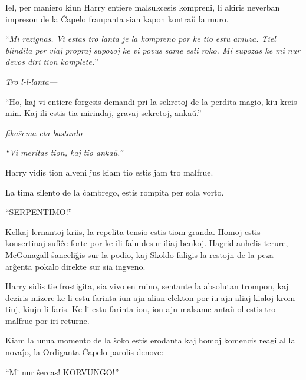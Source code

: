 Iel, per maniero kiun Harry entiere malsukcesis kompreni, li akiris
neverban impreson de la Ĉapelo franpanta sian kapon kontraŭ la muro.

``\emph{Mi rezignas. Vi estas tro lanta je la kompreno por ke tio estu
  amuza. Tiel blindita per viaj propraj supozoj ke vi povus same esti
  roko. Mi supozas ke mi nur devos diri tion komplete.}''

\emph{Tro l-l-lanta—}

``Ho, kaj vi entiere forgesis demandi pri la sekretoj de la perdita
magio, kiu kreis min. Kaj ili estis tia mirindaj, gravaj sekretoj,
ankaŭ.''

\emph{fikaŝema eta bastardo—}

\emph{``Vi meritas tion, kaj tio ankaŭ.''}

Harry vidis tion alveni ĵus kiam tio estis jam tro malfrue.

La tima silento de la ĉambrego, estis rompita per sola vorto.

``SERPENTIMO!''

Kelkaj lernantoj kriis, la repelita tensio estis tiom granda. Homoj
estis konsertinaj sufiĉe forte por ke ili falu desur iliaj
benkoj. Hagrid anhelis terure, McGonagall ŝanceliĝis sur la podio, kaj
Skoldo faligis la restojn de la peza arĝenta pokalo direkte sur sia
ingveno.

Harry sidis tie frostigita, sia vivo en ruino, sentante la absolutan
trompon, kaj deziris mizere ke li estu farinta iun ajn alian elekton
por iu ajn aliaj kialoj krom tiuj, kiujn li faris. Ke li estu farinta
ion, ion ajn malsame antaŭ ol estis tro malfrue por iri returne.

Kiam la unua momento de la ŝoko estis erodanta kaj homoj komencis
reagi al la novaĵo, la Ordiganta Ĉapelo parolis denove:

``Mi nur ŝercas! KORVUNGO!''











  












